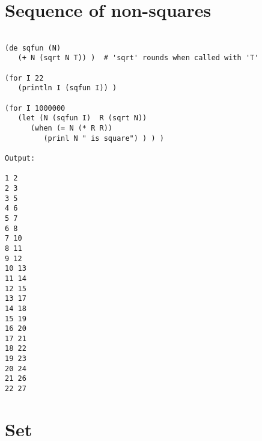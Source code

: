 \section*{Sequence of non-squares}

\begin{verbatim}

(de sqfun (N)
   (+ N (sqrt N T)) )  # 'sqrt' rounds when called with 'T'

(for I 22
   (println I (sqfun I)) )

(for I 1000000
   (let (N (sqfun I)  R (sqrt N))
      (when (= N (* R R))
         (prinl N " is square") ) ) )

Output:

1 2
2 3
3 5
4 6
5 7
6 8
7 10
8 11
9 12
10 13
11 14
12 15
13 17
14 18
15 19
16 20
17 21
18 22
19 23
20 24
21 26
22 27

\end{verbatim}

\section*{Set}

